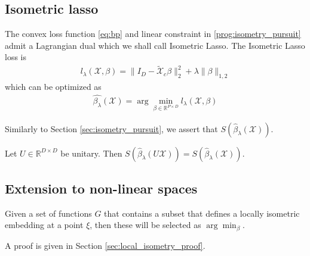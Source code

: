 

\subsection{Isometric lasso}

The convex loss function \ref{eq:bp} and linear constraint in \ref{prog:isometry_pursuit} admit a Lagrangian dual which we shall call Isometric Lasso.
The Isometric Lasso loss is
\begin{align}
l_\lambda (\mathcal X, \beta) =  \|I_D -  \tilde{ \mathcal X}_c \beta\|_2^2 +  \lambda \| \beta \|_{1,2}
\end{align}
which can be optimized as
\begin{align}
\label{prog:isometric_lasso}
\hat {\beta_{\lambda}} (\mathcal X) = \arg \min_{\beta \in \mathbb R^{P \times D}} l_\lambda (\mathcal X, \beta)
\end{align}

Similarly to Section \ref{sec:isometry_pursuit}, we assert that $S(\widehat {\beta}_{\lambda} (\mathcal X))$.

\begin{proposition}
\label{prop:lasso_selection_equivalence}
Let $U \in \mathbb R^{D \times D}$ be unitary.
 Then $S(\widehat \beta_{\lambda}  (U \mathcal X)) = S(\widehat \beta_{\lambda} (\mathcal X))$.
\end{proposition}

\subsection{Extension to non-linear spaces}


\begin{proposition}
\label{prop:local_isometry}
Given a set of functions $G$ that contains a subset that defines a locally isometric embedding at a point $\xi$, then these will be selected as $\arg \min_\beta$.
\end{proposition}
A proof is given in Section \ref{sec:local_isometry_proof}.


